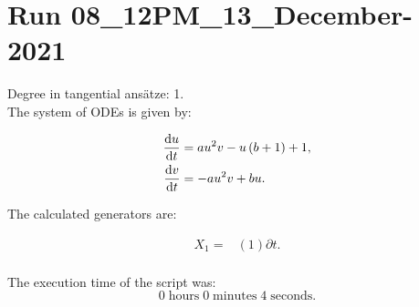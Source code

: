\section*{Run 08\_12PM\_13\_December-2021}
Degree in tangential ansätze:	1.\\
The system of ODEs is given by:

\begin{align*}
\dv{u}{t}&=a u^{2} v - u \left(b + 1\right) + 1,\\
\dv{v}{t}&=- a u^{2} v + b u.\\
\end{align*}

\noindent The calculated generators are:

\begin{align*}
X_{1}=&\left(1 \right)\partial t.\\
\end{align*}

\noindent The execution time of the script was:
$$0\;\mathrm{hours}\;0\;\mathrm{minutes}\;4 \;\mathrm{seconds}.$$
